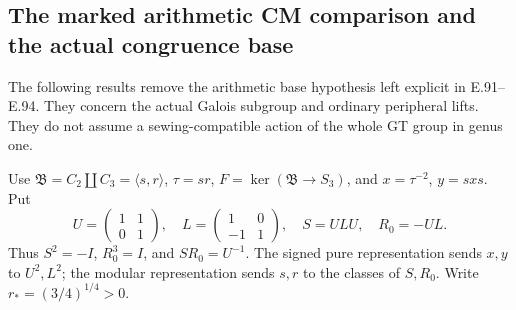 \subsection{The marked arithmetic CM comparison and the actual congruence base}
\label{sec:arithmetic-cm-base}

The following results remove the arithmetic base hypothesis left explicit
in E.91--E.94.  They concern the actual Galois subgroup and ordinary
peripheral lifts.  They do not assume a sewing-compatible action of the
whole GT group in genus one.

Use \(\mathfrak B=C_2\amalg C_3=\langle s,r\rangle\),
\(\tau=sr\), \(F=\ker(\mathfrak B\to S_3)\), and
\(x=\tau^{-2}\), \(y=sxs\).  Put
\[
 U=\begin{pmatrix}1&1\\0&1\end{pmatrix},\quad
 L=\begin{pmatrix}1&0\\-1&1\end{pmatrix},\quad
 S=ULU,\quad R_0=-UL.
\]
Thus \(S^2=-I\), \(R_0^3=I\), and \(SR_0=U^{-1}\).
The signed pure representation sends \(x,y\) to \(U^2,L^2\);
the modular representation sends \(s,r\) to the classes of \(S,R_0\).
Write \(r_*=(3/4)^{1/4}>0\).


